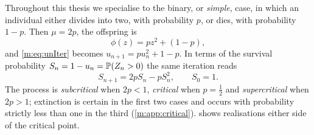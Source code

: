Throughout this thesis we specialise to the binary, or \emph{simple}, case, in
which an individual either divides into two, with probability $p$, or dies, with
probability $1-p$. Then $\mu=2p$, the offspring \pgf{} is
\begin{equation}
\label{m:eq:pgfbinary}
\phi(z) = pz^2 + (1-p),
\end{equation}
and \cref{m:eq:unIter} becomes $u_{n+1} = pu_n^2+1-p$. In terms of the survival
probability $S_n=1-u_n=\mathbb{P}\!\left(Z_n>0\right)$ the same iteration reads
\begin{equation}
\label{m:eq:SnIter}
S_{n+1} = 2pS_n - pS_n^2,\qquad S_0=1 .
\end{equation}
The process is \emph{subcritical} when $2p<1$, \emph{critical} when
$p=\tfrac12$ and \emph{supercritical} when $2p>1$; extinction is certain in the
first two cases and occurs with probability strictly less than one in the third
(\cref{m:app:critical}).  shows realisations either side of the
critical point.

\FloatBarrier
